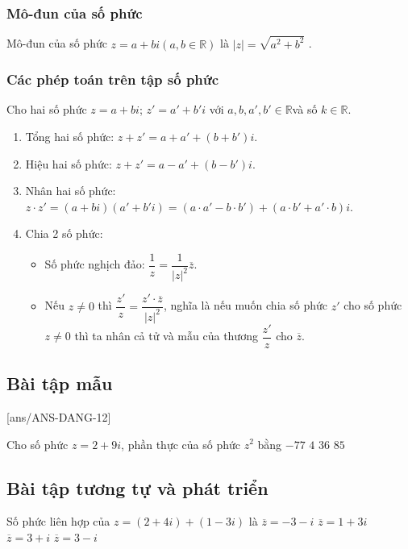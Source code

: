 \begin{khung}
\subsubsection{Mô-đun của số phức}
Mô-đun của số phức $z=a+bi (a, b\in \mathbb{R})$ là  $|z|=\sqrt{a^2+b^2}$ .
\subsubsection{Các phép toán trên tập số phức}
Cho hai số phức $z=a+bi$; $z'=a'+b'i  $ với $a, b, a', b'\in \mathbb{R}$và số $k\in \mathbb{R}$.
\begin{enumerate}
	\item Tổng hai số phức: $z+z'=a+a'+(b+b')i$.
	\item Hiệu hai số phức: $z+z'=a-a'+(b-b')i$.
	\item Nhân hai số phức:  $z\cdot z'=(a+bi)(a'+b'i)=(a\cdot a'-b\cdot b')+(a\cdot b'+a'\cdot b)i$.
	\item Chia 2 số phức:    
	\begin{itemize}
		\item Số phức nghịch đảo: $\dfrac{1}{z}=\dfrac{1}{{| z|}^2}\overline{z}$.
		\item Nếu $z\ne 0$ thì $\dfrac{z'}{z}=\dfrac{z'\cdot \overline{z}}{|z|^2}$, nghĩa là nếu muốn chia số phức $z'$ cho số phức $z\ne 0$ thì ta nhân cả tử và mẫu của thương $\dfrac{z'}{z}$ cho $\overline{z}$.
	\end{itemize}
\end{enumerate}
\end{khung}
\subsection{Bài tập mẫu}
[ans/ANS-DANG-12]
\begin{khung}
\begin{vd}%
	Cho số phức $z=2+9i$, phần thực của số phức $z^2$ bằng
	\choice
	{\True $-77$}
	{$4$}
	{$36$}
	{$85$}
\end{vd}
\end{khung}
\subsection{Bài tập tương tự và phát triển}
\begin{ex}%
	Số phức liên hợp của $z=(2+4i)+(1-3i)$ là
	\choice
	{$\overline{z}=-3-i$}
	{$\overline{z}=1+3i$}
	{$\overline{z}=3+i$}
	{\True $\overline{z}=3-i$}
\end{ex}

